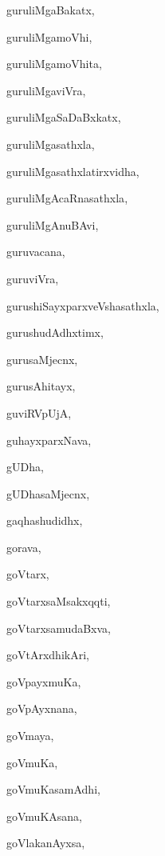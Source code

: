 \begin{multicols}{2}
{guruliMgaBakatx}, \pageref{guruliMgaBakatx}

{guruliMgamoVhi}, \pageref{guruliMgamoVhi}

{guruliMgamoVhita}, \pageref{guruliMgamoVhita}

{guruliMgaviVra}, \pageref{guruliMgaviVra}

{guruliMgaSaDaBxkatx}, \pageref{guruliMgaSaDaBxkatx}

{guruliMgasathxla}, \pageref{guruliMgasathxla}

{guruliMgasathxlatirxvidha}, \pageref{guruliMgasathxlatirxvidha}

{guruliMgAcaRnasathxla}, \pageref{guruliMgAcaRnasathxla}

{guruliMgAnuBAvi}, \pageref{guruliMgAnuBAvi}

{guruvacana}, \pageref{guruvacana}

{guruviVra}, \pageref{guruviVra}

{gurushiSayxparxveVshasathxla}, \pageref{gurushiSayxparxveVshasathxla}

{gurushudAdhxtimx}, \pageref{gurushudAdhxtimx}

{gurusaMjecnx}, \pageref{gurusaMjecnx}

{gurusAhitayx}, \pageref{gurusAhitayx}

{guviRVpUjA}, \pageref{guviRVpUjA}

{guhayxparxNava}, \pageref{guhayxparxNava}

{gUDha}, \pageref{gUDha}

{gUDhasaMjecnx}, \pageref{gUDhasaMjecnx}

{gaqhashudidhx}, \pageref{gaqhashudidhx}

{gorava}, \pageref{gorava}

{goVtarx}, \pageref{goVtarx}

{goVtarxsaMsakxqqti}, \pageref{goVtarxsaMsakxqqti}

{goVtarxsamudaBxva}, \pageref{goVtarxsamudaBxva}

{goVtArxdhikAri}, \pageref{goVtArxdhikAri}

{goVpayxmuKa}, \pageref{goVpayxmuKa}

{goVpAyxnana}, \pageref{goVpAyxnana}

{goVmaya}, \pageref{goVmaya}

{goVmuKa}, \pageref{goVmuKa}

{goVmuKasamAdhi}, \pageref{goVmuKasamAdhi}

{goVmuKAsana}, \pageref{goVmuKAsana}

{goVlakanAyxsa}, \pageref{goVlakanAyxsa}


\end{multicols}
